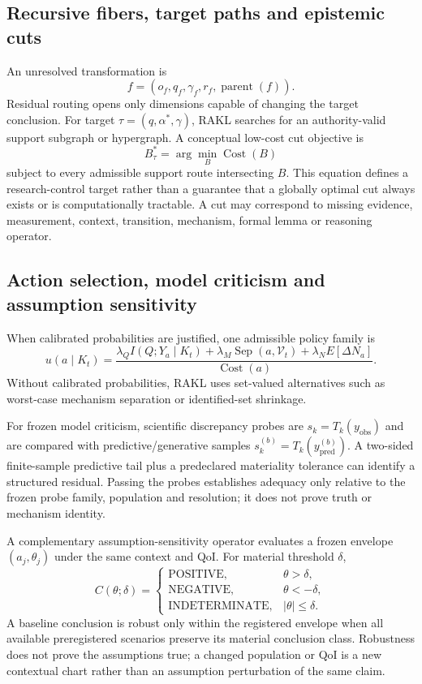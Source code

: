 \documentclass[11pt]{article}
\newcommand{\RAKL}{\textsc{RAKL}}
\begin{document}
\subsection{Recursive fibers, target paths and epistemic cuts}
An unresolved transformation is
\begin{equation}f=(o_f,q_f,\gamma_f,r_f,\operatorname{parent}(f)).\end{equation}
Residual routing opens only dimensions capable of changing the target conclusion. For target $\tau=(q,\alpha^*,\gamma)$, \RAKL{} searches for an authority-valid support subgraph or hypergraph. A conceptual low-cost cut objective is
\begin{equation}B^*_{\tau}=\arg\min_B\operatorname{Cost}(B)\end{equation}
subject to every admissible support route intersecting $B$. This equation defines a research-control target rather than a guarantee that a globally optimal cut always exists or is computationally tractable. A cut may correspond to missing evidence, measurement, context, transition, mechanism, formal lemma or reasoning operator.

\subsection{Action selection, model criticism and assumption sensitivity}
When calibrated probabilities are justified, one admissible policy family is
\begin{equation}u(a\mid K_t)=\frac{\lambda_Q I(Q;Y_a\mid K_t)+\lambda_M\operatorname{Sep}(a,\mathcal V_t)+\lambda_N E[\Delta N_a]}{\operatorname{Cost}(a)}.\end{equation}
Without calibrated probabilities, \RAKL{} uses set-valued alternatives such as worst-case mechanism separation or identified-set shrinkage.

For frozen model criticism, scientific discrepancy probes are $s_k=T_k(y_{\mathrm{obs}})$ and are compared with predictive/generative samples $s_k^{(b)}=T_k(y_{\mathrm{pred}}^{(b)})$. A two-sided finite-sample predictive tail plus a predeclared materiality tolerance can identify a structured residual. Passing the probes establishes adequacy only relative to the frozen probe family, population and resolution; it does not prove truth or mechanism identity.

A complementary assumption-sensitivity operator evaluates a frozen envelope $(a_j,\theta_j)$ under the same context and QoI. For material threshold $\delta$,
\begin{equation}
C(\theta;\delta)=
\begin{cases}
\mathrm{POSITIVE}, & \theta>\delta,\\
\mathrm{NEGATIVE}, & \theta<-\delta,\\
\mathrm{INDETERMINATE}, & |\theta|\le\delta.
\end{cases}
\end{equation}
A baseline conclusion is robust only within the registered envelope when all available preregistered scenarios preserve its material conclusion class. Robustness does not prove the assumptions true; a changed population or QoI is a new contextual chart rather than an assumption perturbation of the same claim.
\end{document}
